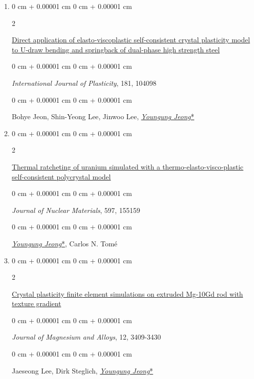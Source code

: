 \documentclass[10pt, letterpaper]{article}
\newenvironment{onecolentry}{
    \begin{adjustwidth}{
        0 cm + 0.00001 cm
    }{
        0 cm + 0.00001 cm
    }
}{
    \end{adjustwidth}
} %
\newenvironment{twocolentry}[2][]{
    \onecolentry
    \def\secondColumn{#2}
    \setcolumnwidth{\fill, 4.5 cm}
    \begin{paracol}{2}
}{
    \switchcolumn \raggedleft \secondColumn
    \end{paracol}
    \endonecolentry
} %
\begin{document}
\begin{enumerate}
        \item
        \begin{twocolentry}{2024}
            \href{https://doi.org/10.1016/j.ijplas.2024.104098}{Direct application of elasto‑viscoplastic self‑consistent crystal plasticity model to U‑draw bending and springback of dual‑phase high strength steel}
        \end{twocolentry}
        \begin{onecolentry}
            {\it International Journal of Plasticity}, 181, 104098
        \end{onecolentry}
        \begin{onecolentry}
            Bohye Jeon, Shin-Yeong Lee, Jinwoo Lee, {\underline{\textit{Youngung Jeong}*}}
        \end{onecolentry}
        \vspace{0.10 cm}

        \item
        \begin{twocolentry}{2024}
            \href{https://doi.org/10.1016/j.jnucmat.2024.155159}{Thermal ratcheting of uranium simulated with a thermo-elasto-visco-plastic self-consistent polycrystal model}
        \end{twocolentry}
        \begin{onecolentry}
            {\it Journal of Nuclear Materials}, 597, 155159
        \end{onecolentry}
        \begin{onecolentry}
            {\underline{\textit{Youngung Jeong}*}}, Carlos N. Tomé
        \end{onecolentry}
        \vspace{0.10 cm}

        \item
        \begin{twocolentry}{2024}
            \href{https://doi.org/10.1016/j.jma.2024.08.009}{Crystal plasticity finite element simulations on extruded Mg-10Gd rod with texture gradient}
        \end{twocolentry}
        \begin{onecolentry}
            {\it Journal of Magnesium and Alloys}, 12, 3409-3430
        \end{onecolentry}
        \begin{onecolentry}
            Jaeseong Lee, Dirk Steglich, {\underline{\textit{Youngung Jeong}*}}
        \end{onecolentry}
        \vspace{0.10 cm}


\end{enumerate}
\end{document}
